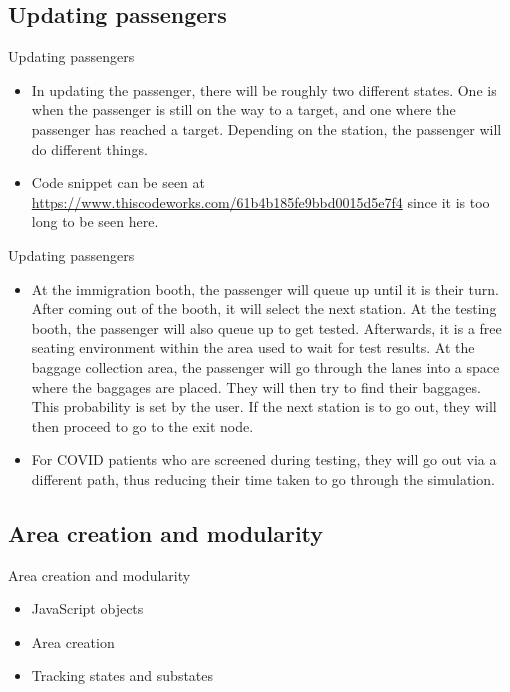 \documentclass{beamer}
\begin{document}
\subsection{Updating passengers}
\begin{frame}{Updating passengers}
	
	\begin{itemize}
		\item In updating the passenger, there will be roughly two different states. One is when the passenger is still on the way to a target, and one where the passenger has reached a target. Depending on the station, the passenger will do different things.
		\item Code snippet can be seen at \url{https://www.thiscodeworks.com/61b4b185fe9bbd0015d5e7f4} since it is too long to be seen here.
		
	\end{itemize}
	
	
\end{frame}
\begin{frame}{Updating passengers}
	
	\begin{itemize}
		\item At the immigration booth, the passenger will queue up until it is their turn. After coming out of the booth, it will select the next station. At the testing booth, the passenger will also queue up to get tested. Afterwards, it is a free seating environment within the area used to wait for test results. At the baggage collection area, the passenger will go through the lanes into a space where the baggages are placed. They will then try to find their baggages. This probability is set by the user. If the next station is to go out, they will then proceed to go to the exit node.
		\item For COVID patients who are screened during testing, they will go out via a different path, thus reducing their time taken to go through the simulation.
		
	\end{itemize}
	
	
\end{frame}

\subsection{Area creation and modularity}
\begin{frame}{Area creation and modularity}
	\begin{itemize}
		\item JavaScript objects
		\item Area creation
		\item Tracking states and substates
	\end{itemize}
\end{frame}
\end{document}
